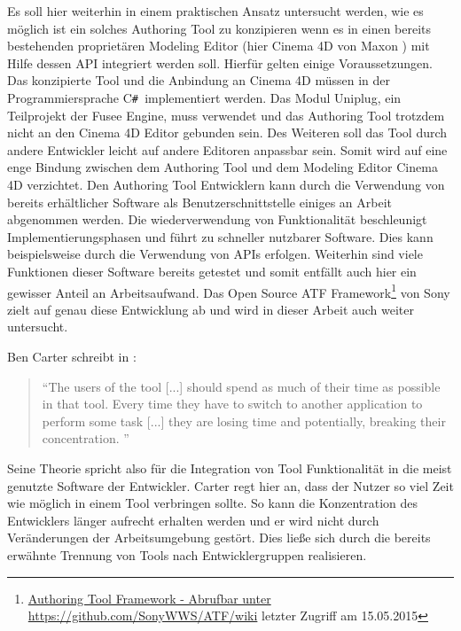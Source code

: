 \documentclass[pagesize, paper=a4, fontsize=12pt, titlepage=true, headings=small, headnosepline, abstractoff, liststotoc, nochapterprefix, plainheadsepline, twoside]{scrreprt}
\newcommand{\CSS}{C\texttt{\# }}
\begin{document}
Es soll hier weiterhin in einem praktischen Ansatz untersucht werden, wie es möglich ist ein solches Authoring Tool zu konzipieren wenn es in einen bereits bestehenden proprietären Modeling Editor (hier Cinema 4D von Maxon ) mit Hilfe dessen API integriert werden soll. Hierfür gelten einige Voraussetzungen. Das konzipierte Tool und die Anbindung an Cinema 4D müssen in der Programmiersprache \CSS implementiert werden. Das Modul Uniplug, ein Teilprojekt der Fusee Engine, muss verwendet und das Authoring Tool trotzdem nicht an den Cinema 4D Editor gebunden sein. Des Weiteren soll das Tool durch andere Entwickler leicht auf andere Editoren anpassbar sein. Somit wird auf eine enge Bindung zwischen dem Authoring Tool und dem Modeling Editor Cinema 4D verzichtet. Den Authoring Tool Entwicklern kann durch die Verwendung von bereits erhältlicher Software als Benutzerschnittstelle einiges an Arbeit abgenommen werden. Die wiederverwendung von Funktionalität beschleunigt Implementierungsphasen und führt zu schneller nutzbarer Software. Dies kann beispielsweise durch die Verwendung von APIs erfolgen. Weiterhin sind viele Funktionen dieser Software bereits getestet und somit entfällt auch hier ein gewisser Anteil an Arbeitsaufwand. Das Open Source ATF Framework\footnote{\url{Authoring Tool Framework - Abrufbar unter https://github.com/SonyWWS/ATF/wiki} letzter Zugriff am 15.05.2015} von Sony zielt auf genau diese Entwicklung ab und wird in dieser Arbeit auch weiter untersucht.

Ben Carter schreibt in :
\begin{quote}
“The users of the tool [...] should spend as much of their time as possible in that tool. Every time they have to switch to another application to perform some task [...] they are losing time and potentially, breaking their concentration. \cite[S. 18]{Carter2004}”
\end{quote}
Seine Theorie spricht also für die Integration von Tool Funktionalität in die meist genutzte Software der Entwickler. Carter regt hier an, dass der Nutzer so viel Zeit wie möglich in einem Tool verbringen sollte. So kann die Konzentration des Entwicklers länger aufrecht erhalten werden und er wird nicht durch Veränderungen der Arbeitsumgebung gestört. Dies ließe sich durch die bereits erwähnte Trennung von Tools nach Entwicklergruppen realisieren.
\end{document}
